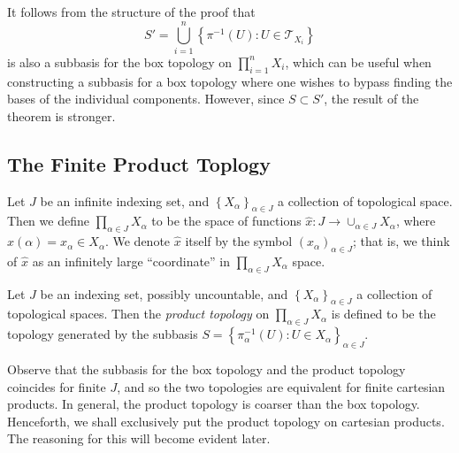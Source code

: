\begin{remark}
\label{rem:can-sub-open-sets}
It follows from the structure of the proof that
\begin{equation*}
S' = \bigcup_{i=1}^{n} \left\{ \pi^{-1}(U): U \in \mathcal{T}_{X_{i}}  \right\}
\end{equation*}
is also a subbasis for the box topology on $\prod_{i=1}^{n} X_{i}$, which
can be useful when constructing a subbasis for a box topology where
one wishes to bypass finding the bases of the individual components.
However, since $S \subset S'$, the result of the theorem is stronger.
\end{remark}
\subsection{The Finite Product Toplogy}
\begin{definition}
\label{def:infinite-cartesian}
Let \(J\) be an infinite indexing set, and \(\left\{ X_{\alpha}
\right\}_{\alpha \in J}\) a collection of topological space. Then we
define \(\prod_{\alpha \in J} X_{\alpha}\) to be the space of
functions \(\hat{x}: J \to \cup_{\alpha \in J} X_{\alpha}\), where
\(\hat{x}(\alpha) = x_{\alpha} \in X_{\alpha}\). We denote
\(\hat{x}\) itself by the symbol \( (x_{\alpha})_{\alpha \in J} \); that is,
we think of \(\hat{x}\) as an infinitely large ``coordinate''
in \(\prod_{\alpha \in J} X_{\alpha}\) space.
\end{definition}
\begin{definition}
\label{def:product-toplogy}
Let \(J\) be an indexing set, possibly uncountable, and
\(\left\{ X_{\alpha} \right\}_{\alpha \in J}\) a
collection of topological spaces. Then the \emph{product topology}
on \(\prod_{\alpha \in J} X_{\alpha}\) is defined to be the topology generated
by the subbasis \(S = \left\{ \pi_{\alpha}^{-1}(U): U \in X_{\alpha}
\right\}_{\alpha \in J}\).
\end{definition}
\begin{remark}
\label{rem:coincide-box-toplogy}
Observe that the subbasis for the box topology and the product topology
coincides for finite \(J\), and so the two topologies are equivalent for
finite cartesian products. In general, the product topology is coarser than
the box topology. Henceforth, we shall exclusively put the product topology on
cartesian products. The reasoning for this will become evident later.
\end{remark}
